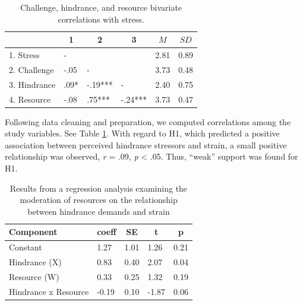 \documentclass[
  man]{apa6}
\begin{document}
\begin{table}[tbp]

\begin{center}
\begin{threeparttable}

\caption{\label{tab:cortab}Challenge, hindrance, and resource bivariate correlations with stress.}

\begin{tabular}{llllll}
\toprule
 & \multicolumn{1}{c}{1} & \multicolumn{1}{c}{2} & \multicolumn{1}{c}{3} & \multicolumn{1}{c}{$M$} & \multicolumn{1}{c}{$SD$}\\
\midrule
1. Stress & - &  &  & 2.81 & 0.89\\
2. Challenge & -.05 & - &  & 3.73 & 0.48\\
3. Hindrance & .09* & -.19*** & - & 2.40 & 0.75\\
4. Resource & -.08 & .75*** & -.24*** & 3.73 & 0.47\\
\bottomrule
\end{tabular}

\end{threeparttable}
\end{center}

\end{table}

Following data cleaning and preparation, we computed correlations among the study variables. See Table \ref{tab:cortab}. With regard to H1, which predicted a positive association between perceived hindrance stressors and strain, a small positive relationship was observed, \emph{r} = .09, \emph{p} \textless{} .05. Thus, ``weak'' support was found for H1.

\begin{table}[tbp]

\begin{center}
\begin{threeparttable}

\caption{\label{tab:table}Results from a regression analysis examining the moderation of resources on the relationship between hindrance demands and strain}

\begin{tabular}{lllll}
\toprule
Component & \multicolumn{1}{c}{coeff} & \multicolumn{1}{c}{SE} & \multicolumn{1}{c}{t} & \multicolumn{1}{c}{p}\\
\midrule
Constant & 1.27 & 1.01 & 1.26 & 0.21\\
Hindrance (X) & 0.83 & 0.40 & 2.07 & 0.04\\
Resource (W) & 0.33 & 0.25 & 1.32 & 0.19\\
Hindrance x Resource & -0.19 & 0.10 & -1.87 & 0.06\\
\bottomrule
\end{tabular}

\end{threeparttable}
\end{center}

\end{table}
\end{document}
